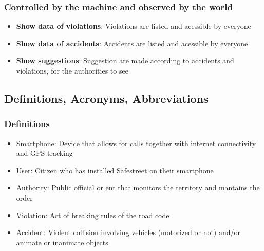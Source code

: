 \subsubsection*{Controlled by the machine and observed by the world}

\begin{itemize}

\item \textbf{Show data of violations}: Violations are listed and acessible by everyone

\item \textbf{Show data of accidents}: Accidents are listed and acessible by everyone

\item \textbf{Show suggestions}: Suggestion are made according to accidents and violations, for the authorities to see

\end{itemize}

\subsection{Definitions, Acronyms, Abbreviations}

\subsubsection{Definitions}

\begin{itemize}

\item Smartphone: Device that allows for calls together with internet connectivity and GPS tracking

\item User: Citizen who has installed Safestreet on their smartphone

\item Authority: Public official or ent that monitors the territory and mantains the order

\item Violation: Act of breaking rules of the road code

\item Accident: Violent collision involving vehicles (motorized or not) and/or animate or inanimate objects
 
\end{itemize}

